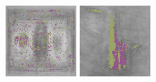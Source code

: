 \documentclass{article}
\begin{document}
\begin{figure}[!b]
\begin{minipage}[c]{.21\linewidth}
    \centering\centerline{\includegraphics[width=\linewidth]{imgs/dennis_cal/dollar/products/497.png}}
  \end{minipage}
  \begin{minipage}[c]{.21\linewidth}
    \centering\centerline{\includegraphics[width=\linewidth]{imgs/dennis_cal/saxophone/products/497.png}}

\end{minipage}
\end{figure}
\end{document}
